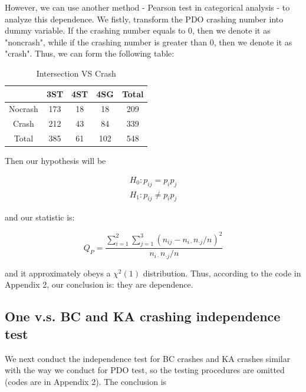 \documentclass[11pt]{scrartcl} %
\begin{document}
\par
However, we can use another method - Pearson test in categorical analysis - to analyze this dependence. We fistly, transform the PDO crashing number into dummy variable. If the crashing number equals to 0, then we denote it as "noncrash", while if the crashing number is greater than 0, then we denote it as "crash". Thus, we can form the following table:

\begin{table}[H]
\caption{Intersection VS Crash}
\centering
\begin{tabular}{|c|c|c|c|c|}
\hline
      & 3ST & 4ST & 4SG & Total \\
\hline
Nocrash & 173 & 18  & 18 & 209 \\
\hline
Crash    & 212  & 43  & 84  & 339 \\
\hline
Total    & 385  & 61  & 102  & 548 \\
\hline
\end{tabular}
\end{table}

Then our hypothesis will be

\begin{equation*}
\begin{array}{l}
{H_0}:{p_{ij}} = {p_i}{p_j}\\
{H_1}:{p_{ij}} \ne {p_i}{p_j}
\end{array}
\end{equation*}

and our statistic is:

\begin{equation*}
{Q_P} = \frac{{\sum\limits_{i = 1}^2 {\sum\limits_{j = 1}^3 {{{\left( {{n_{ij}} - {n_{i \cdot }}{n_{ \cdot j}}/n} \right)}^2}} } }}{{{n_{i \cdot }}{n_{ \cdot j}}/n}}
\end{equation*}

and it approximately obeys a ${\chi ^2}\left( 1 \right)$ distribution. Thus, according to the code in Appendix 2, our conclusion is: they are dependence.

\subsection{One v.s. BC and KA crashing independence test}

We next conduct the independence test for BC crashes and KA crashes similar with the way we conduct for PDO test, so the testing procedures are omitted (codes are in Appendix 2). The conclusion is
\end{document}
